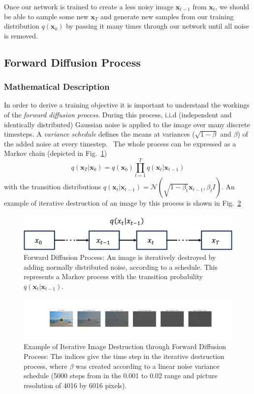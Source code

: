 Once our network is trained to create a less noisy image $\bm{x}_{t-1}$ from $\bm{x}_t$, we should be able to sample some new $\bm{x}_T$ and generate new samples from our training distribution $q(\bm{x}_0)$ by passing it many times through our network until all noise is removed.

\subsection{Forward Diffusion Process}
\subsubsection{Mathematical Description}
In order to derive a training objective it is important to understand the workings of the \textit{forward diffusion process}. During this process, i.i.d (independent and identically distributed) Gaussian noise is applied to the image over many discrete timesteps. A \textit{variance schedule} defines the means at variances ($\sqrt{1-\beta}$ and $\beta$) of the added noise at every timestep.~\autocite{ho2020denoising} The whole process can be expressed as a Markov chain (depicted in Fig.~\ref{fig:forward_diffusion})
\begin{equation}
    q(\bm{x}_T|\bm{x}_0) = q(\bm{x}_0) \prod_{t=1}^{T} q(\bm{x}_{t}|\bm{x}_{t-1})
\end{equation}
with the transition distributions $q(\bm{x}_t|\bm{x}_{t-1}) = \mathcal{N}(\sqrt{1-\beta_t} \bm{x}_{t-1}, \beta_t I)$. An example of iterative destruction of an image by this process is shown in Fig.~\ref{fig:forward_naoshima}

\begin{figure}[h]
    \centering
    \includegraphics[width=.5\textwidth]{images/forward_diffusion.png}
    \caption{Forward Diffusion Process: An image is iteratively destroyed by adding normally distributed noise,
        according to a schedule. This represents a Markov process with the transition probability $q(\bm{x}_t|\bm{x}_{t-1})$.}
    \label{fig:forward_diffusion}
\end{figure}

\begin{figure}[h]
    \centering
    \includegraphics[width=\textwidth]{images/forward_naoshima.png}
    \caption{Example of Iterative Image Destruction through Forward Diffusion Process:
        The indices give the time step in the iterative destruction process, where $\beta$ was created according to a linear noise variance schedule (5000 steps from in the 0.001 to 0.02 range and picture resolution of 4016 by 6016 pixels).}
    \label{fig:forward_naoshima}
\end{figure}

